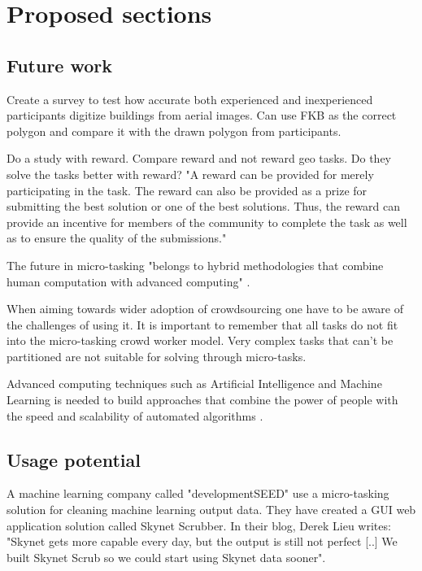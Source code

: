 \chapter{Proposed sections}

\section{Future work}

Create a survey to test how accurate both experienced and inexperienced participants digitize buildings from aerial images. Can use FKB as the correct polygon and compare it with the drawn polygon from participants. 

Do a study with reward. Compare reward and not reward geo tasks. Do they solve the tasks better with reward? "A reward can be provided for merely participating in the task. The reward can also be provided as a prize for submitting the best solution or one of the best solutions. Thus, the reward can provide an incentive for members of the community to complete the task as well as to ensure the quality of the submissions."  %

The future in micro-tasking "belongs to hybrid methodologies that combine human computation with advanced computing" \citep{Meier2013}. 

When aiming towards wider adoption of crowdsourcing one have to be aware of the challenges of using it. It is important to remember that all tasks do not fit into the micro-tasking crowd worker model. Very complex tasks that can't be partitioned are not suitable for solving through micro-tasks. 

Advanced computing techniques such as Artificial Intelligence and Machine Learning is needed to build approaches that combine the power of people with the speed and scalability of automated algorithms \citep{Meier2013}. 

\section{Usage potential}
A machine learning company called "developmentSEED" use a micro-tasking solution for cleaning machine learning output data. They have created a GUI web application solution called Skynet Scrubber. In their blog, Derek Lieu writes: "Skynet gets more capable every day, but the output is still not perfect [..] We built Skynet Scrub so we could start using Skynet data sooner". 

